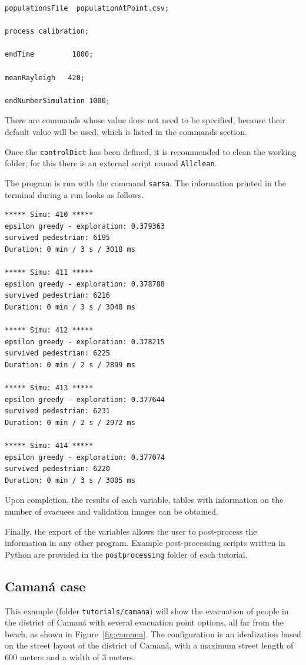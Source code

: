 \documentclass[12pt,a4paper]{book}
\newenvironment{csvblock}{\par\noindent\begin{minipage}{\linewidth}}{\end{minipage}\par}
\begin{document}
\begin{csvblock}
\begin{lstlisting}[style=control]
populationsFile  populationAtPoint.csv;

process calibration;

endTime         1800;

meanRayleigh   420;

endNumberSimulation 1000;
\end{lstlisting}
\end{csvblock}

There are commands whose value does not need to be specified, because their default value will be
used, which is listed in the commands section.

Once the \texttt{controlDict} has been defined, it is recommended to clean the working folder; for
this there is an external script named \texttt{Allclean}.

The program is run with the command \texttt{sarsa}. The information printed in the terminal during
a run looks as follows.
\begin{lstlisting}[style=shell]
***** Simu: 410 *****
epsilon greedy - exploration: 0.379363
survived pedestrian: 6195
Duration: 0 min / 3 s / 3018 ms

***** Simu: 411 *****
epsilon greedy - exploration: 0.378788
survived pedestrian: 6216
Duration: 0 min / 3 s / 3040 ms

***** Simu: 412 *****
epsilon greedy - exploration: 0.378215
survived pedestrian: 6225
Duration: 0 min / 2 s / 2899 ms

***** Simu: 413 *****
epsilon greedy - exploration: 0.377644
survived pedestrian: 6231
Duration: 0 min / 2 s / 2972 ms

***** Simu: 414 *****
epsilon greedy - exploration: 0.377074
survived pedestrian: 6220
Duration: 0 min / 3 s / 3005 ms
\end{lstlisting}

Upon completion, the results of each variable, tables with information on the number of evacuees
and validation images can be obtained.

Finally, the export of the variables allows the user to post-process the information in any other
program. Example post-processing scripts written in Python are provided in the
\texttt{postprocessing} folder of each tutorial.

\subsection{Camaná case}
This example (folder \texttt{tutorials/camana}) will show the evacuation of people in the district of
Camaná with several evacuation point options, all far from the beach, as shown in
Figure~\ref{fig:camana}. The configuration is an
idealization based on the street layout of the district of Camaná, with a maximum street length of
600 meters and a width of 3 meters.
\end{document}
